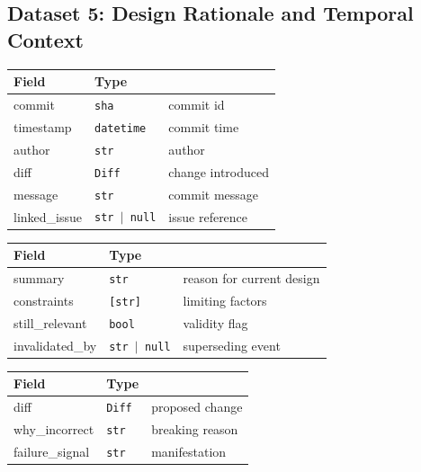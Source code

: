 \documentclass[a4paper,12pt]{article}
\begin{document}
\subsection{Dataset 5: Design Rationale and Temporal Context}

\begin{tcolorbox}[title=HistoryEntry]
\footnotesize
\begin{tabularx}{\linewidth}{@{} l l Y @{}}
\toprule
\textbf{Field} & \textbf{Type} & \\
\midrule
commit & \texttt{sha} & commit id \\
timestamp & \texttt{datetime} & commit time \\
author & \texttt{str} & author \\
diff & \texttt{Diff} & change introduced \\
message & \texttt{str} & commit message \\
linked\_issue & \texttt{str $\mid$ null} & issue reference \\
\bottomrule
\end{tabularx}
\end{tcolorbox}

\begin{tcolorbox}[title=Rationale]
\footnotesize
\begin{tabularx}{\linewidth}{@{} l l Y @{}}
\toprule
\textbf{Field} & \textbf{Type} & \\
\midrule
summary & \texttt{str} & reason for current design \\
constraints & \texttt{[str]} & limiting factors \\
still\_relevant & \texttt{bool} & validity flag \\
invalidated\_by & \texttt{str $\mid$ null} & superseding event \\
\bottomrule
\end{tabularx}
\end{tcolorbox}

\begin{tcolorbox}[title=NaiveRefactor]
\footnotesize
\begin{tabularx}{\linewidth}{@{} l l Y @{}}
\toprule
\textbf{Field} & \textbf{Type} & \\
\midrule
diff & \texttt{Diff} & proposed change \\
why\_incorrect & \texttt{str} & breaking reason \\
failure\_signal & \texttt{str} & manifestation \\
\bottomrule
\end{tabularx}
\end{tcolorbox}
\end{document}
